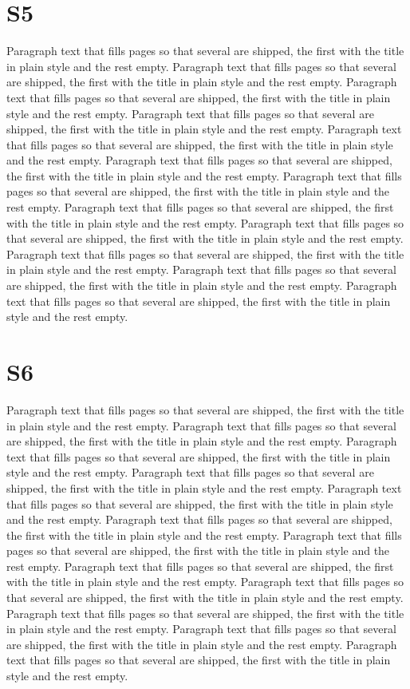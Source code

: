 \documentclass{article}
\begin{document}
\section{S5}
Paragraph text that fills pages so that several are shipped, the first with the title in plain style and the rest empty. Paragraph text that fills pages so that several are shipped, the first with the title in plain style and the rest empty. Paragraph text that fills pages so that several are shipped, the first with the title in plain style and the rest empty. Paragraph text that fills pages so that several are shipped, the first with the title in plain style and the rest empty. Paragraph text that fills pages so that several are shipped, the first with the title in plain style and the rest empty. Paragraph text that fills pages so that several are shipped, the first with the title in plain style and the rest empty. Paragraph text that fills pages so that several are shipped, the first with the title in plain style and the rest empty. Paragraph text that fills pages so that several are shipped, the first with the title in plain style and the rest empty. Paragraph text that fills pages so that several are shipped, the first with the title in plain style and the rest empty. Paragraph text that fills pages so that several are shipped, the first with the title in plain style and the rest empty. Paragraph text that fills pages so that several are shipped, the first with the title in plain style and the rest empty. Paragraph text that fills pages so that several are shipped, the first with the title in plain style and the rest empty. 

\section{S6}
Paragraph text that fills pages so that several are shipped, the first with the title in plain style and the rest empty. Paragraph text that fills pages so that several are shipped, the first with the title in plain style and the rest empty. Paragraph text that fills pages so that several are shipped, the first with the title in plain style and the rest empty. Paragraph text that fills pages so that several are shipped, the first with the title in plain style and the rest empty. Paragraph text that fills pages so that several are shipped, the first with the title in plain style and the rest empty. Paragraph text that fills pages so that several are shipped, the first with the title in plain style and the rest empty. Paragraph text that fills pages so that several are shipped, the first with the title in plain style and the rest empty. Paragraph text that fills pages so that several are shipped, the first with the title in plain style and the rest empty. Paragraph text that fills pages so that several are shipped, the first with the title in plain style and the rest empty. Paragraph text that fills pages so that several are shipped, the first with the title in plain style and the rest empty. Paragraph text that fills pages so that several are shipped, the first with the title in plain style and the rest empty. Paragraph text that fills pages so that several are shipped, the first with the title in plain style and the rest empty. 
\end{document}
